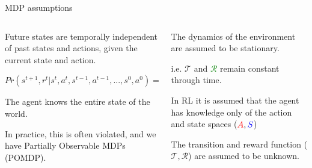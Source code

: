 \begin{frame}{MDP assumptions}

    \begin{columns}[T]
        \begin{column}{0.5\textwidth}
            \blist
                \item Future states are temporally independent of past states and actions, given the current state and action. 
                \item $Pr(s^{t+1}, r^{t}|s^{t}, a^{t}, s^{t-1}, a^{t-1}, ...,s^0, a^0) = Pr(s^{t+1}, r^{t}|s^{t}, a^{t})$
            \elist 
            \vspace{10pt}
            \blist
                \item The agent knows the entire state of the world. 
                \item In practice, this is often violated, and we have Partially Observable MDPs (POMDP).
            \elist       
        \end{column}
        
        \hspace{10pt}
        
        \begin{column}{0.5\textwidth}
            
            \blist
                \item The dynamics of the environment are assumed to be stationary. 
                \item i.e. $\mathcal{T}$ and \textcolor{green}{$\mathcal{R}$} remain constant through time. 
            \elist
            \vspace{10pt}
            \blist
                \item In RL it is assumed that the agent has knowledge only of the action and state spaces ($\textcolor{red}{A}, \textcolor{blue}{S}$)
                \item The transition and reward function ($\mathcal{T}, \mathcal{R}$) are assumed to be unknown.
            \elist
        
        \end{column}
    \end{columns}
\end{frame}

